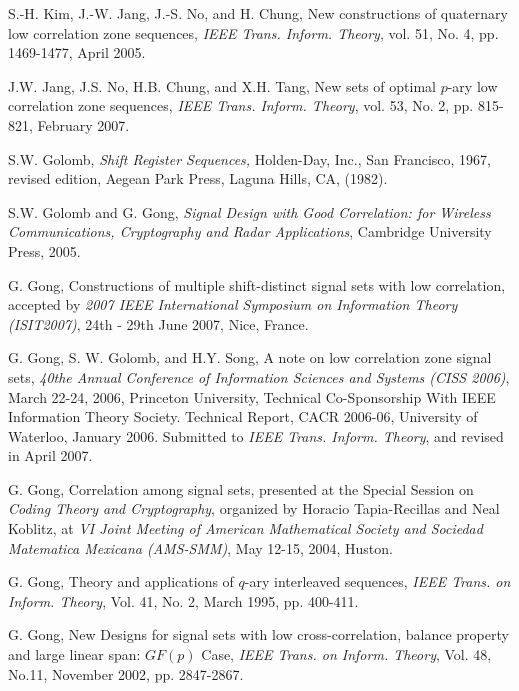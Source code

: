 \documentclass{article}
\begin{document}
 


\begin{thebibliography}{1}



 S.-H. Kim, J.-W. Jang, J.-S. No, and H. Chung,  New constructions of quaternary low correlation zone sequences,  {\em IEEE Trans. Inform. Theory}, vol. 51, No. 4, pp. 1469-1477, April 2005.

 J.W. Jang, J.S. No, H.B. Chung, and X.H. Tang, New sets of optimal $p$-ary low correlation zone sequences,  {\em IEEE Trans. Inform. Theory}, vol. 53, No. 2, pp. 815-821,  February  2007.


 S.W. Golomb, {\it Shift Register Sequences,}
Holden-Day, Inc., San Francisco, 1967, revised edition, Aegean
Park Press, Laguna Hills, CA, (1982).

 S.W. Golomb and G. Gong, {\em Signal Design
with Good Correlation: for Wireless Communications, Cryptography
and Radar Applications}, Cambridge University Press, 2005.


 G. Gong, Constructions of multiple shift-distinct signal sets with low correlation, accepted by {\em  2007 IEEE International Symposium on Information Theory (ISIT2007)}, 
24th - 29th June 2007,  Nice, France. 

  G.  Gong, S. W. Golomb, and H.Y. Song,  A note on low correlation zone signal sets, {\em 40the Annual Conference of Information Sciences and Systems  (CISS 2006)}, March 22-24, 2006, Princeton University, Technical Co-Sponsorship With IEEE Information Theory Society. Technical Report,  CACR 2006-06, University of Waterloo, January 2006. Submitted to {\em  IEEE Trans. Inform. Theory}, and revised in April 2007. 

 G. Gong, Correlation among signal sets,  presented at the Special
Session on {\em Coding Theory and Cryptography}, organized by
Horacio Tapia-Recillas and  Neal Koblitz, at {\em VI Joint Meeting
of  American Mathematical Society and Sociedad Matematica Mexicana
 (AMS-SMM)}, May 12-15, 2004,  Huston.




  G. Gong,  Theory  and applications of $q$-ary  interleaved sequences,
{\em IEEE Trans. on Inform. Theory}, Vol. 41, No. 2, March 1995,
pp. 400-411.

 G. Gong, New Designs for signal sets with low cross-correlation,
balance property and large linear span: $GF(p)$ Case, {\em  IEEE
Trans. on Inform. Theory},  Vol. 48, No.11, November 2002, pp.
2847-2867.





\end{thebibliography}
\end{document}
